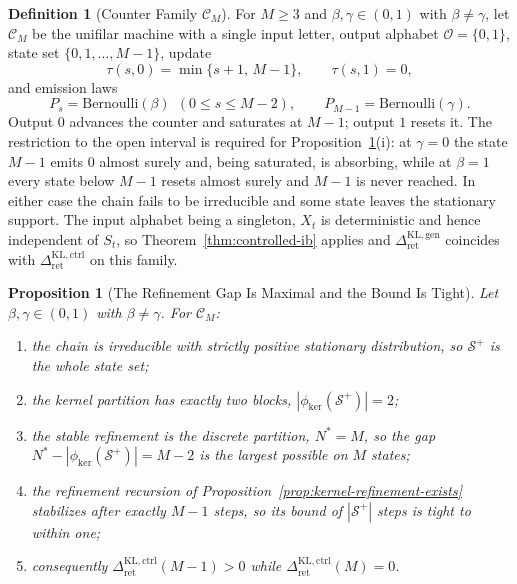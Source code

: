 \documentclass[12pt]{article}
\newtheorem{proposition}[theorem]{Proposition}
\theoremstyle{definition}
\newtheorem{definition}[theorem]{Definition}
\newcommand{\Splus}{\mathcal S^{+}}
\newcommand{\RetKLc}{\Delta_{\mathrm{ret}}^{\mathrm{KL,ctrl}}}
\newcommand{\RetKLg}{\Delta_{\mathrm{ret}}^{\mathrm{KL,gen}}}
\begin{document}
\begin{definition}[Counter Family $\mathcal C_M$]
\label{def:counter-family}
For $M\ge3$ and $\beta,\gamma\in(0,1)$ with $\beta\neq\gamma$, let
$\mathcal C_M$ be the unifilar machine with a single input letter, output
alphabet $\mathcal O=\{0,1\}$, state set $\{0,1,\dots,M-1\}$, update
\[
\tau(s,0)=\min\{s+1,\,M-1\},
\qquad
\tau(s,1)=0,
\]
and emission laws
\[
P_s=\mathrm{Bernoulli}(\beta)\ \ (0\le s\le M-2),
\qquad
P_{M-1}=\mathrm{Bernoulli}(\gamma).
\]
Output $0$ advances the counter and saturates at $M-1$; output $1$ resets it.
The restriction to the open interval is required for
Proposition~\ref{prop:refinement-extremal}(i): at $\gamma=0$ the state $M-1$
emits $0$ almost surely and, being saturated, is absorbing, while at $\beta=1$
every state below $M-1$ resets almost surely and $M-1$ is never reached.  In
either case the chain fails to be irreducible and some state leaves the
stationary support.  The input alphabet being a singleton, $X_t$ is
deterministic and hence independent of $S_t$, so
Theorem~\ref{thm:controlled-ib} applies and $\RetKLg$ coincides with
$\RetKLc$ on this family.
\end{definition}

\begin{proposition}[The Refinement Gap Is Maximal and the Bound Is Tight]
\label{prop:refinement-extremal}
Let $\beta,\gamma\in(0,1)$ with $\beta\neq\gamma$.  For $\mathcal C_M$:
\begin{enumerate}[label=(\roman*)]
\item the chain is irreducible with strictly positive stationary
distribution, so $\Splus$ is the whole state set;
\item the kernel partition has exactly two blocks,
$|\phi_{\ker}(\Splus)|=2$;
\item the stable refinement is the discrete partition, $N^{\ast}=M$, so the
gap $N^{\ast}-|\phi_{\ker}(\Splus)|=M-2$ is the largest possible on $M$
states;
\item the refinement recursion of
Proposition~\ref{prop:kernel-refinement-exists} stabilizes after exactly
$M-1$ steps, so its bound of $|\Splus|$ steps is tight to within one;
\item consequently $\RetKLc(M-1)>0$ while $\RetKLc(M)=0$.
\end{enumerate}
\end{proposition}
\end{document}

